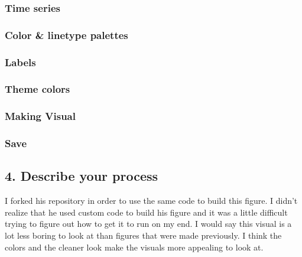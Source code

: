 \documentclass[
  letterpaper,
  DIV=11,
  numbers=noendperiod]{scrartcl}
\begin{document}
\subsubsection{Time series}\label{time-series}

\subsubsection{Color \& linetype
palettes}\label{color-linetype-palettes}

\subsubsection{Labels}\label{labels}

\subsubsection{Theme colors}\label{theme-colors}

\subsubsection{Making Visual}\label{making-visual}

\subsubsection{Save}\label{save}

\subsection{4. Describe your process}\label{describe-your-process}

I forked his repository in order to use the same code to build this
figure. I didn't realize that he used custom code to build his figure
and it was a little difficult trying to figure out how to get it to run
on my end. I would say this visual is a lot less boring to look at than
figures that were made previously. I think the colors and the cleaner
look make the visuals more appealing to look at.
\end{document}
